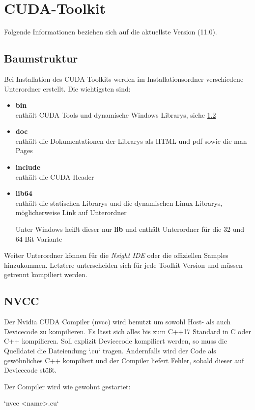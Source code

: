 		
		\section{CUDA-Toolkit}
		Folgende Informationen beziehen sich auf die aktuellste Version (11.0).
		
			\subsection{Baumstruktur}\label{tree}
			Bei Installation des CUDA-Toolkits werden im Installationsordner verschiedene Unterordner erstellt. Die wichtigsten sind:
			\begin{itemize}
			    \item \textbf{bin}\\ enthält CUDA Tools und dynamische Windows Librarys, siehe \ref{tools}
			    \item \textbf{doc}\\ enthält die Dokumentationen der Librarys als HTML und pdf sowie die man-Pages
			    \item \textbf{include}\\ enthält die CUDA Header
			    \item \textbf{lib64}\\ enthält die statischen Librarys und die dynamischen Linux Librarys, möglicherweise Link auf Unterordner
			    
			    Unter Windows hei\ss t dieser nur \textbf{lib} und enthält Unterordner für die 32 und 64 Bit Variante
			\end{itemize}
			Weiter Unterordner können für die \textit{Nsight IDE} oder die offiziellen Samples hinzukommen. Letztere unterscheiden sich für jede Toolkit Version und müssen getrennt kompiliert werden.
			
			\subsection{NVCC}\label{tools}
			Der Nvidia CUDA Compiler (\gls{nvcc}) wird benutzt um sowohl Host- als auch Devicecode zu kompilieren. Es lässt sich alles bis zum C++17 Standard in C oder C++ kompilieren. Soll explizit Devicecode kompiliert werden, so muss die Quelldatei die Dateiendung \li`.cu` tragen. Andernfalls wird der Code als gewöhnliches C++ kompiliert und der Compiler liefert Fehler, sobald dieser auf Devicecode stößt.
		
			Der Compiler wird wie gewohnt gestartet:
		
			\li`nvcc <name>.cu`
		
